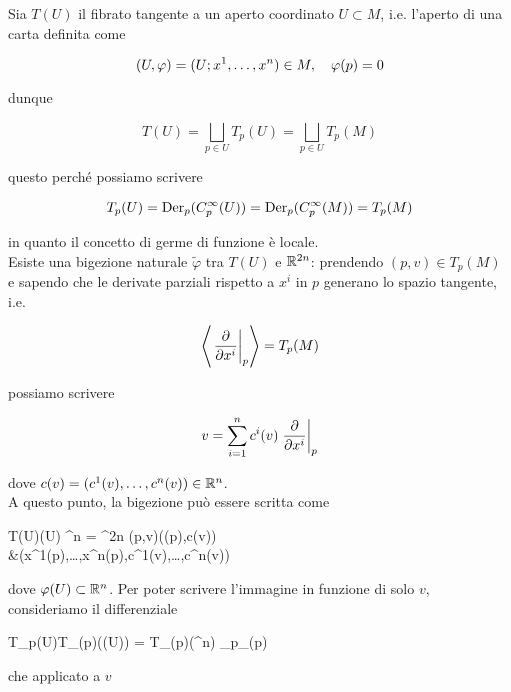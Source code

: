 Sia $ T(U) $ il fibrato tangente a un aperto coordinato $ U \subset M $, i.e. l'aperto di una carta definita come

\begin{equation}
	(U,\varphi) = (U; x^{1},\dots,x^{n}) \in M \qcomma \varphi(p) = 0
\end{equation}

dunque

\begin{equation}
	T(U) = \bigsqcup_{p \in U} T_{p}(U) = \bigsqcup_{p \in U} T_{p}(M)
\end{equation}

questo perché possiamo scrivere

\begin{equation}
	T_{p}(U) = \operatorname{Der}_{p}(C_{p}^{\infty}(U)) = \operatorname{Der}_{p}(C_{p}^{\infty}(M)) = T_{p}(M)
\end{equation}

in quanto il concetto di germe di funzione è locale. \\
Esiste una bigezione naturale $ \tilde{\varphi} $ tra $ T(U) $ e $ \mathbb{R}^{2n} $: prendendo $ (p,v) \in T_{p}(M) $ e sapendo che le derivate parziali rispetto a $ x^{i} $ in $ p $ generano lo spazio tangente, i.e.

\begin{equation}
	\ev{ \eval{ \pdv{x^{i}} }_{p} } = T_{p}(M)
\end{equation}

possiamo scrivere

\begin{equation}
	v = \sum_{i=1}^{n} c^{i}(v) \eval{ \pdv{x^{i}} }_{p}
\end{equation}

dove $ c(v) = (c^{1}(v),\dots,c^{n}(v)) \in \mathbb{R}^{n} $. \\
A questo punto, la bigezione può essere scritta come

\map{\tilde{\varphi}}
	{T(U)}{\varphi(U) \times \R^{n} = \R^{2n}}
	{(p,v)}{(\varphi(p),c(v)) \\
		&\mapsto (x^{1}(p),\dots,x^{n}(p),c^{1}(v),\dots,c^{n}(v))
		}

dove $ \varphi(U) \subset \mathbb{R}^{n} $. Per poter scrivere l'immagine in funzione di solo $ v $, consideriamo il differenziale

	{T_{p}(U)}{T_{\varphi(p)}(\varphi(U)) =  T_{\varphi(p)}(\R^{n})}
	{_{p}}{_{\varphi(p)}}

che applicato a $ v $

